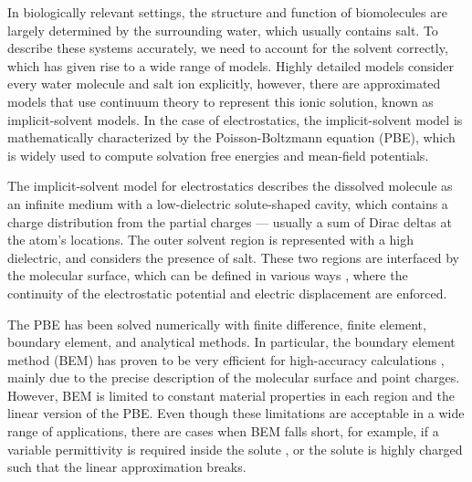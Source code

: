 In biologically relevant settings, the structure and function of biomolecules are largely determined by the surrounding water, which usually contains salt. 
To describe these systems accurately, we need to account for the solvent correctly, which has given rise to a wide range of models.\cite{onufriev2018water}
Highly detailed models consider every water molecule and salt ion explicitly, however, there are approximated models that use continuum theory to represent this ionic solution, known as implicit-solvent models.\cite{RouxSimonson1999,DecherchiETal2015}
In the case of electrostatics, the implicit-solvent model is mathematically characterized by the Poisson-Boltzmann equation (PBE)\cite{Baker2004,Bardhan2012}, which is widely used to compute solvation free energies and mean-field potentials.

The implicit-solvent model for electrostatics describes the dissolved molecule as an infinite medium with a low-dielectric solute-shaped cavity, which contains a charge distribution from the partial charges --- usually a sum of Dirac deltas at the atom's locations.
The outer solvent region is represented with a high dielectric, and considers the presence of salt.
These two regions are interfaced by the molecular surface, which can be defined in various ways \cite{HarrisBoschitcshFenley2013}, where the continuity of the electrostatic potential and electric displacement are enforced.

The PBE has been solved numerically with finite difference\cite{BakerETal2001,GilsonETal1985,JurrusETal2018,LiETal2019}, finite element\cite{HolstETal2012,BondEtal2010}, boundary element\cite{boschitsch2002fast,LuETal2006,AltmanBardhanWhiteTidor09,bajaj2011efficient,GengKrasny2013,CooperBardhanBarba2014}, and analytical\cite{YapHeadgordon2010,FelbergETal2017} methods.
In particular, the boundary element method (BEM) has proven to be very efficient for high-accuracy calculations \cite{GengKrasny2013,CooperBardhanBarba2014}, mainly due to the precise description of the molecular surface and point charges. 
However, BEM is limited to constant material properties in each region and the linear version of the PBE. 
Even though these limitations are acceptable in a wide range of applications, there are cases when BEM falls short, for example, if a variable permittivity is required inside the solute \cite{grant2001smooth,li2013dielectric}, or the solute is highly charged such that the linear approximation breaks\cite{FogolariETal1999}.

